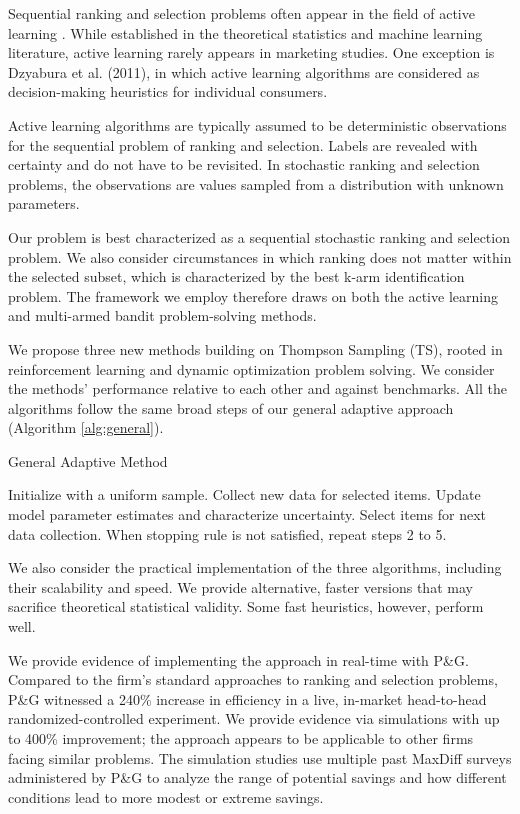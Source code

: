 \documentclass[nonblindrev]{informs3}
\begin{document}
Sequential ranking and selection problems often appear in the field of active learning \citep{balcan2009agnostic,dasgupta2008general}. While established in the theoretical statistics and machine learning literature, active learning rarely appears in marketing studies. One exception is Dzyabura et al. (2011), in which active learning algorithms are considered as decision-making heuristics for individual consumers. 

Active learning algorithms are typically assumed to be deterministic observations for the sequential problem of ranking and selection. Labels are revealed with certainty and do not have to be revisited. In stochastic ranking and selection problems, the observations are values sampled from a distribution with unknown parameters.

Our problem is best characterized as a sequential stochastic ranking and selection problem. We also consider circumstances in which ranking does not matter within the selected subset, which is characterized by the best k-arm identification problem. The framework we employ therefore draws on both the active learning and multi-armed bandit problem-solving methods.

We propose three new methods building on Thompson Sampling (TS), rooted in reinforcement learning and dynamic optimization problem solving. We consider the methods' performance relative to each other and against benchmarks. All the algorithms follow the same broad steps of our general adaptive approach (Algorithm \ref{alg:general}).

\begin{algorithm}
\caption{General Adaptive Method} \label{alg:general}
\begin{algorithmic}[1]
\State Initialize with a uniform sample.
\State Collect new data for selected items.
\State Update model parameter estimates and characterize uncertainty.
\State Select items for next data collection.
\State When stopping rule is not satisfied, repeat steps 2 to 5.
\end{algorithmic}
\end{algorithm}

We also consider the practical implementation of the three algorithms, including their scalability and speed. We provide alternative, faster versions that may sacrifice theoretical statistical validity. Some fast heuristics, however, perform well.

We provide evidence of implementing the approach in real-time with P\&G. Compared to the firm's standard approaches to ranking and selection problems, P\&G witnessed a 240\% increase in efficiency in a live, in-market head-to-head randomized-controlled experiment. We provide evidence via simulations with up to 400\% improvement; the approach appears to be applicable to other firms facing similar problems. The simulation studies use multiple past MaxDiff surveys administered by P\&G to analyze the range of potential savings and how different conditions lead to more modest or extreme savings.
\end{document}
